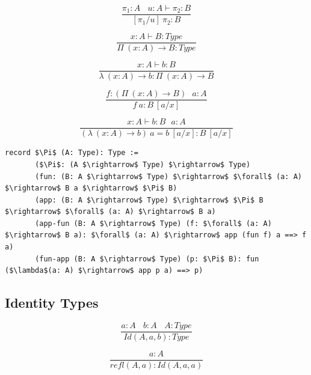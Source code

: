 \documentclass[11pt,oneside]{article}
\begin{document}
\begin{equation}
\tag{subst}
\dfrac
  {\pi_1 : A\ \ \ \ u:A \vdash \pi_2 : B}
  {[\pi_1/u]\ \pi_2 : B}
\end{equation}

\begin{equation}
\tag{$\Pi$-formation}
\dfrac
  {x:A \vdash B : Type}
  {\Pi\ (x:A) \rightarrow B : Type}
\end{equation}

\begin{equation}
\tag{$\lambda$-intro}
\dfrac
  {x:A \vdash b : B}
  {\lambda\ (x:A) \rightarrow b : \Pi\ (x: A) \rightarrow B }
\end{equation}

\begin{equation}
\tag{$App$-elimination}
\dfrac
  {f: (\Pi\ (x:A) \rightarrow B)\ \ \ a: A}
  {f\ a : B\ [a/x]}
\end{equation}

\begin{equation}
\tag{$\beta$-computation}
\dfrac
  {x:A \vdash b: B\ \ \ a:A}
  {(\lambda\ (x:A) \rightarrow b)\ a = b\ [a/x] : B\ [a/x]}
\end{equation}

\newpage

\begin{lstlisting}[mathescape=true]
record $\Pi$ (A: Type): Type :=
       ($\Pi$: (A $\rightarrow$ Type) $\rightarrow$ Type)
       (fun: (B: A $\rightarrow$ Type) $\rightarrow$ $\forall$ (a: A) $\rightarrow$ B a $\rightarrow$ $\Pi$ B)
       (app: (B: A $\rightarrow$ Type) $\rightarrow$ $\Pi$ B $\rightarrow$ $\forall$ (a: A) $\rightarrow$ B a)
       (app-fun (B: A $\rightarrow$ Type) (f: $\forall$ (a: A) $\rightarrow$ B a): $\forall$ (a: A) $\rightarrow$ app (fun f) a ==> f a)
       (fun-app (B: A $\rightarrow$ Type) (p: $\Pi$ B): fun ($\lambda$(a: A) $\rightarrow$ app p a) ==> p)
\end{lstlisting}

  \subsection{Identity Types}

\begin{equation}
\tag{$Id$-formation}
\dfrac
  {a:A\ \ \ \ b:A\ \ \ \ A:Type}
  {Id(A,a,b) : Type}
\end{equation}

\begin{equation}
\tag{$Id$-intro}
\dfrac
  {a:A}
  {refl(A,a) : Id(A,a,a) }
\end{equation}
\end{document}
